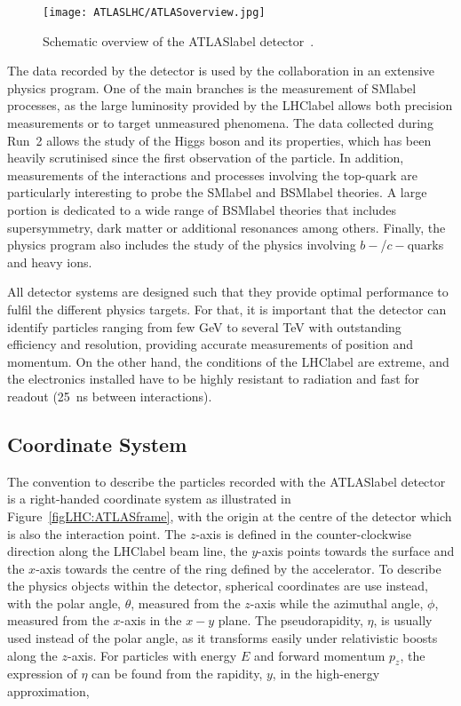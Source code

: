 \begin{figure}[htbp]
    \RawFloats
    \begin{center}
    \texttt{[image: ATLASLHC/ATLASoverview.jpg]}
    \caption{
        Schematic overview of the \acrshort{ATLASlabel} detector~\cite{Collaboration_2008}. 
    }
    \label{figLHC:ATLAS}
    \end{center}
\end{figure}

The data recorded by the detector is used by the collaboration in an extensive physics program. One of the main branches is the measurement of \acrshort{SMlabel} processes, as the large luminosity provided by the \acrshort{LHClabel} allows both precision measurements or to target unmeasured phenomena. The data collected during Run~2 allows the study of the Higgs boson and its properties, which has been heavily scrutinised since the first observation of the particle. In addition, measurements of the interactions and processes involving the top-quark are particularly interesting to probe the \acrshort{SMlabel} and \acrshort{BSMlabel} theories. A large portion is dedicated to a wide range of \acrshort{BSMlabel} theories that includes supersymmetry, dark matter or additional resonances among others. Finally, the physics program also includes the study of the physics involving $b-$/$c-$quarks and heavy ions.

All detector systems are designed such that they provide optimal performance to fulfil the different physics targets. For that, it is important that the detector can identify particles ranging from few GeV to several TeV with outstanding efficiency and resolution, providing accurate measurements of position and momentum. On the other hand, the conditions of the \acrshort{LHClabel} are extreme, and the electronics installed have to be highly resistant to radiation and fast for readout (25~ns between interactions).

\subsection{Coordinate System}

The convention to describe the particles recorded with the \acrshort{ATLASlabel} detector is a right-handed coordinate system as illustrated in Figure~\ref{figLHC:ATLASframe}, with the origin at the centre of the detector which is also the interaction point. The $z$-axis is defined in the counter-clockwise direction along the \acrshort{LHClabel} beam line, the $y$-axis points towards the surface and the $x$-axis towards the centre of the ring defined by the accelerator. To describe the physics objects within the detector, spherical coordinates are use instead, with the polar angle, $\theta$, measured from the $z$-axis while the azimuthal angle, $\phi$, measured from the $x$-axis in the $x-y$ plane. The pseudorapidity, $\eta$, is usually used instead of the polar angle, as it transforms easily under relativistic boosts along the $z$-axis. For particles with energy $E$ and forward momentum $p_z$, the expression of $\eta$ can be found from the rapidity, $y$, in the high-energy approximation,

